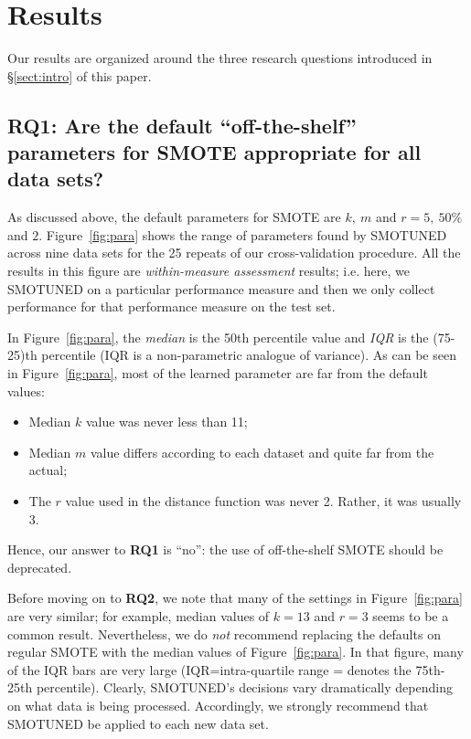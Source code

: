 \documentclass[10pt,conference]{IEEEtran}
\newcommand{\bi}{\begin{itemize}[leftmargin=0.4cm]}
\newcommand{\ei}{\end{itemize}}
\theoremstyle{break}
\theoremstyle{break}
\newcommand{\tion}[1]{{\S}\ref{sect:#1}}
\newcommand{\sma}{{\sc SMOTE}}
\newcommand{\smb}{{\sc SMOTUNED}}
\begin{document}
 
   

\section{Results}
\label{sect:results}

Our results are organized around the three
research questions introduced in \tion{intro} of this paper.

 \subsection{{\bf RQ1}: Are the default ``off-the-shelf'' parameters for SMOTE appropriate for all
 data sets?}
 
 
 As discussed above, the default parameters for
 {\sma} are $k,\ m$ and $r = 5,\ 50\%$ and $2$.
  Figure~\ref{fig:para} shows the range of parameters
 found by {\smb} across  nine data sets for the 25 repeats of our cross-validation procedure.
 All the results in this figure are {\em within-measure assessment} results; i.e.
 here, we {\smb}  on a particular performance measure and then we only collect performance for that performance measure on the test set.
 
 
 In  Figure~\ref{fig:para}, the {\em median} is the 50th percentile
 value and {\em IQR} is the (75-25)th percentile
 (IQR is a non-parametric analogue of variance).
 As can be seen in Figure~\ref{fig:para}, most of the learned parameter are far from the default values:
 \bi
 \item 
 Median $k$ value was never less than 11;
 \item
 Median $m$ value differs according to each dataset and quite far from the actual;
 \item
 The $r$ value used in the distance function was never 2. Rather, it was usually 3.
 \ei
 Hence,  our answer to {\bf RQ1} is ``no'': the use of off-the-shelf {\sma} should be deprecated. 
 
 Before moving on to {\bf RQ2}, we note that many of the settings in Figure~\ref{fig:para} are very similar; for example, median values of $k=13$ and $r=3$ seems to be a common
result.  Nevertheless, we do {\em not} recommend replacing
the defaults on regular {\sma} with the median values
of Figure~\ref{fig:para}. In that figure, many of the  IQR bars are
very large (IQR=intra-quartile range = denotes the
75th-25th percentile). Clearly, SMOTUNED's decisions vary dramatically
depending on what data  is being processed.  Accordingly,
we strongly recommend that {\smb} be applied to each new data set.
\end{document}
